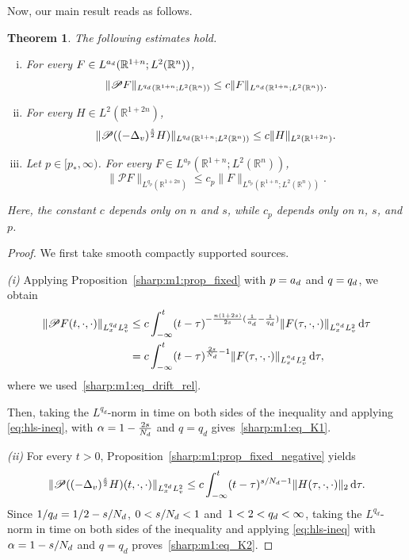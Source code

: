 \documentclass[leqno,10pt]{amsart}
\theoremstyle{plain}
\newtheorem{theorem}{Theorem}[section]
\theoremstyle{remark}
\numberwithin{equation}{section}
\def\er{\mathbb{R}}
\def\ern{\mathbb{R}^n}
\begin{document}
{Now, our main result reads as follows.
\begin{theorem}
\label{sharp:thm_mixed_parametrix}
The following estimates hold.
\begin{enumerate}[(i)]
\item For every $F\in L^{a_{\rm d}}(\er^{1+n};L^2(\ern))$,
\begin{equation}
\label{sharp:m1:eq_K1}
\|\mathscr{P}F\|_{L^{q_{\rm d}}(\er^{1+n};L^2(\ern))}
\leq c\|F\|_{L^{a_{\rm d}}(\er^{1+n};L^2(\ern))}.
\end{equation}
\item For every $H\in L^2(\er^{1+2n})$,
\begin{equation}
\label{sharp:m1:eq_K2}
\|\mathscr P((-\Delta_v)^\frac{s}{2}H)\|_{L^{q_{\rm d}}(\er^{1+n};L^2(\ern))}
\leq c\|H\|_{L^2(\er^{1+2n})}.
\end{equation}
\item Let $p\in[p_*,\infty)$. For every $F\in L^{a_p}(\er^{1+n};L^2(\ern))$,
\begin{equation}
\label{sharp:m1:eq_K3}
\|\mathscr P F\|_{L^{q_p}(\er^{1+2n})}
\leq c_p\|F\|_{L^{a_p}(\er^{1+n};L^2(\ern))}.
\end{equation}
\end{enumerate}
Here, the constant $c$ depends only on $n$ and $s$, while $c_p$ depends only on $n$, $s$, and $p$.
\end{theorem}
\begin{proof}
We first take smooth compactly supported sources. 

\noindent
{\it (i)} Applying Proposition~\ref{sharp:m1:prop_fixed} with $p=a_{\rm d}$ and $q=q_{\rm d}$, we obtain
\begin{align*}
\|\mathscr PF(t,\cdot,\cdot)\|_{L^{q_{\rm d}}_xL^2_v}
&\leq
c\int_{-\infty}^t
(t-\tau)^{-\frac{n(1+2s)}{2s}(\frac1{a_{\rm d}}-\frac1{q_{\rm d}})}
\|F(\tau,\cdot,\cdot)\|_{L^{a_{\rm d}}_xL^2_v}
\,\mathrm d\tau
\\
&=
c\int_{-\infty}^t
(t-\tau)^{\frac{2s}{N_{\rm d}}-1}
\|F(\tau,\cdot,\cdot)\|_{L^{a_{\rm d}}_xL^2_v}
\,\mathrm d\tau,
\end{align*}
where we used~\eqref{sharp:m1:eq_drift_rel}.


Then, taking the $L^{q_d}$-norm in time on both sides of the inequality and applying \eqref{eq:hls-ineq}, with $\alpha=1 - \frac{2s}{N_{\rm d}}$ and $q=q_d$ gives~\eqref{sharp:m1:eq_K1}.

\noindent
{\it (ii)} For every $t>0$, Proposition~\ref{sharp:m1:prop_fixed_negative} yields
$$
\|\mathscr P((-\Delta_v)^\frac{s}{2}H)(t,\cdot,\cdot)\|_{L^{q_{\rm d}}_xL^2_v}
\leq
c\int_{-\infty}^t
(t-\tau)^{s/N_{\rm d}-1}
\|H(\tau,\cdot,\cdot)\|_2\,\mathrm d\tau.
$$
Since $1/q_{\rm d}=1/2-s/N_{\rm d}$, $0<s/N_{\rm d}<1$ and~$1<2<q_{\rm d}<\infty$, taking the $L^{q_d}$-norm in time on both sides of the inequality and applying \eqref{eq:hls-ineq} 
with $\alpha=1-s/N_{\rm d}$ and $q=q_d$ proves~\eqref{sharp:m1:eq_K2}.


\end{proof}}
\end{document}
